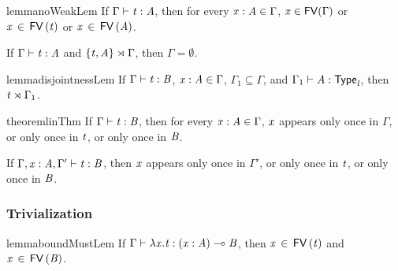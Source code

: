 \begin{restatable}{lemma}{noWeakLem}
  \label{lemma:no_weakening}
  If $\Gamma  \vdash  \mathit{t}  :  \mathit{A}$, then for every
  $ \mathit{x}  :  \mathit{A}  \in  \Gamma $, $ \mathit{x}  \in \mathsf{FV}( \Gamma ) $ or $\mathit{x} \, \in \, \mathsf{FV} \, (  \mathit{t}  )$ or $\mathit{x} \, \in \, \mathsf{FV} \, (  \mathit{A}  )$.  
\end{restatable}

\begin{lemma}
  \label{lemma:disjoint-contra}
  If $\Gamma  \vdash  \mathit{t}  :  \mathit{A}$ and $\{  \mathit{t}  ,  \mathit{A}  \}  \rtimes  \Gamma$, then $\Gamma =  \emptyset $.
\end{lemma}

\begin{restatable}[Disjointness]{lemma}{disjointnessLem}
  \label{lemma:disjointness}
  If $\Gamma  \vdash  \mathit{t}  :  \mathit{B}$, $ \mathit{x}  :  \mathit{A}  \in  \Gamma $, $\Gamma_{{\mathrm{1}}} \subseteq \Gamma$, and $\Gamma_{{\mathrm{1}}}  \vdash  \mathit{A}  :   \mathsf{Type}_{ \mathit{l} } $, then
  $\mathit{t}  \rtimes  \Gamma_{{\mathrm{1}}}$.
\end{restatable}

\begin{restatable}[Linearity]{theorem}{linThm}
  \label{thm:linearity}
  If $\Gamma  \vdash  \mathit{t}  :  \mathit{B}$, then for every $ \mathit{x}  :  \mathit{A}  \in  \Gamma $, $\mathit{x}$ appears only once in
  $\Gamma$, or only once in $\mathit{t}$, or only once in $\mathit{B}$.
\end{restatable}

\begin{corollary}
  \label{corollary:linearity}
  If $\Gamma  ,  \mathit{x}  :  \mathit{A}  ,  \Gamma'  \vdash  \mathit{t}  :  \mathit{B}$, then $\mathit{x}$ appears only once in
  $\Gamma'$, or only once in $\mathit{t}$, or only once in $\mathit{B}$.
\end{corollary}

\subsubsection{Trivialization}
\label{subsec:trivialization}

\begin{restatable}{lemma}{boundMustLem}
  \label{lemma:lambda-bound_variables_must_be_used}
  If $\Gamma  \vdash   \lambda  \mathit{x}  .  \mathit{t}   :  (  \mathit{x}  :  \mathit{A}  )  \multimap  \mathit{B}$, then $\mathit{x} \, \in \, \mathsf{FV} \, (  \mathit{t}  )$ and $\mathit{x} \, \in \, \mathsf{FV} \, (  \mathit{B}  )$.
\end{restatable}

